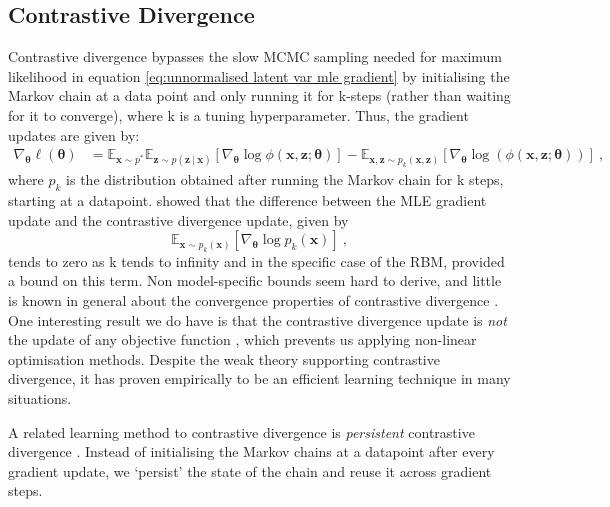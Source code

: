 \documentclass[11pt, oneside]{article}
\newcommand{\thetab}{{\boldsymbol{\theta}}}
\newcommand{\pnn}{\phi}
\newcommand{\gradtheta}{\nabla_{\thetab}}
\newcommand{\x}{{\mathbf x}}
\newcommand{\z}{{\mathbf z}}
\newcommand{\E}{\mathbb{E}}
\newcommand{\Edata}{\E_{\x \sim p^*}}
\newcommand\given[1][]{\:#1\vert\:}
\theoremstyle{definition}
\begin{document}
\subsection{Contrastive Divergence}
\label{sec:cd}
Contrastive divergence \citep{hinton2006training} bypasses the slow MCMC sampling needed for maximum likelihood in equation \ref{eq:unnormalised latent var mle gradient} by initialising the Markov chain at a data point and only running it for k-steps (rather than waiting for it to converge), where k is a tuning hyperparameter. Thus, the gradient updates are given by:
\begin{align}
    \label{eq:cd grad update}
    \nabla_{\thetab} \ell(\thetab) &= \Edata \E_{\z \sim p(\z \given \x)} \left[ \nabla_{\thetab} \log \pnn(\x, \z;\thetab) \right] - \E_{\x, \z \sim p_k(\x, \z)} \left[\nabla_{\thetab} \log \left(\pnn(\x, \z;\thetab) \right) \right] \ , 
\end{align}
where $p_k$ is the distribution obtained after running the Markov chain for k steps, starting at a datapoint. \citet{bengio2009justifying} showed that the difference between the MLE gradient update and the contrastive divergence update, given by 
\begin{equation}
    \label{eq:cd bias}
    \E_{\x \sim p_k(\x)} \left[ \gradtheta \log p_k(\x) \right] \ ,
\end{equation}
tends to zero as k tends to infinity and in the specific case of the RBM, provided a bound on this term. Non model-specific bounds seem hard to derive, and little is known in general about the convergence properties of contrastive divergence \citep{carreira2005contrastive}. One interesting result we do have is that the contrastive divergence update is \emph{not} the update of any objective function \citep{sutskever2010convergence}, which prevents us applying non-linear optimisation methods. Despite the weak theory supporting contrastive divergence, it has proven empirically to be an efficient learning technique in many situations.

A related learning method to contrastive divergence is  \emph{persistent} contrastive divergence \citep{younes1998stochastic, tieleman2009using}. Instead of initialising the Markov chains at a datapoint after every gradient update, we `persist' the state of the chain and reuse it across gradient steps. 

\end{document}
